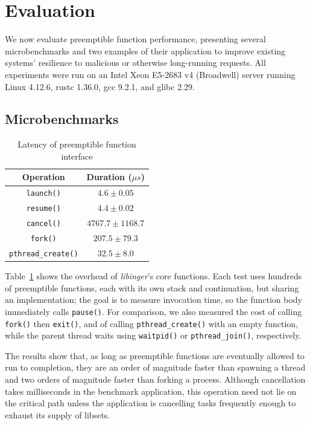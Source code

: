 \section{Evaluation}
\label{sec:eval}

We now evaluate preemptible function performance, presenting several
microbenchmarks and two examples of their application to improve
existing systems' resilience to malicious or otherwise long-running
requests.  All experiments were run on an Intel Xeon E5-2683 v4 (Broadwell)
server running Linux 4.12.6, rustc 1.36.0, gcc 9.2.1, and glibc 2.29.



\subsection{Microbenchmarks}

\begin{table}
\begin{center}
\begin{tabular}{c | c}
Operation & Duration ($\mu{s}$) \\
\hline
\texttt{launch()} & $4.6 \pm 0.05$ \\
\texttt{resume()} & $4.4 \pm 0.02$ \\
\texttt{cancel()} & $4767.7 \pm 1168.7$ \\
\hline
\texttt{fork()} & $207.5 \pm 79.3$ \\
\texttt{pthread\_create()} & $32.5 \pm 8.0$
\end{tabular}
\end{center}
\caption{Latency of preemptible function interface}
\label{tab:libinger}
\end{table}

Table~\ref{tab:libinger} shows the overhead of \textit{libinger}'s core functions.
Each test uses hundreds of preemptible functions, each with its own stack and
continuation, but sharing an implementation; the goal is to measure invocation time,
so the function body immediately calls \texttt{pause()}.
For comparison, we also measured the cost of calling \texttt{fork()} then
\texttt{exit()}, and of calling \texttt{pthread\_create()} with an empty function,
while the parent
thread waits using \texttt{waitpid()} or \texttt{pthread\_join()}, respectively.

The results show that, as long as preemptible functions are eventually allowed to run
to completion, they are an order of magnitude faster than spawning a thread and two
orders of magnitude faster than forking a process.  Although cancellation takes
milliseconds in the benchmark application, this operation need not lie on the
critical path unless the application is cancelling tasks frequently enough to exhaust
its supply of libsets.

